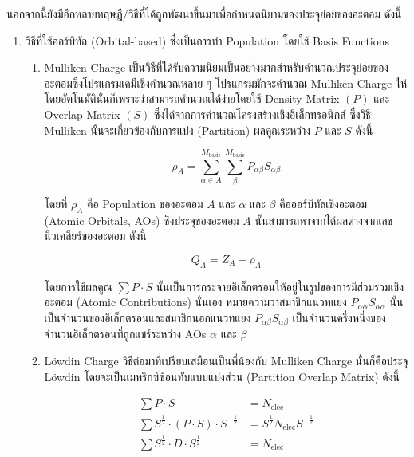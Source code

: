 นอกจากนี้ยังมีอีกหลายทฤษฎี/วิธีที่ได้ถูกพัฒนาขึ้นมาเพื่อกำหนดนิยามของประจุย่อยของอะตอม ดังนี้
%
\begin{enumerate}[topsep=0pt,noitemsep]\setlength\itemsep{0.5em}
    \item วิธีที่ใช้ออร์บิทัล (Orbital-based) ซึ่งเป็นการทำ Population โดยใช้ Basis Functions
          \begin{enumerate}
              \item Mulliken Charge\autocite{szabo1996} เป็นวิธีที่ได้รับความนิยมเป็นอย่างมากสำหรับคำนวณประจุย่อยของอะตอมซึ่งโปรแกรมเคมีเชิงคำนวณหลาย ๆ โปรแกรมมักจะคำนวณ Mulliken Charge ให้โดยอัตโนมัตินั่นก็เพราะว่าสามารถคำนวณได้ง่ายโดยใช้ Density Matrix $(P)$ และ Overlap Matrix $(S)$ ซึ่งได้จากการคำนวณโครงสร้างเชิงอิเล็กทรอนิกส์ ซึ่งวิธี Mulliken นั้นจะเกี่ยวข้องกับการแบ่ง (Partition) ผลคูณระหว่าง $P$ และ $S$ ดังนี้

                    \begin{equation}\label{eq:mulliken_pop}
                        \rho_{A} = \sum^{M_{\text{basis}}}_{\alpha \in A} \sum^{M_{\text{basis}}}_{\beta}
                        P_{\alpha\beta} S_{\alpha\beta}
                    \end{equation}

                    \noindent โดยที่ $\rho_{A}$ คือ Population ของอะตอม $A$ และ $\alpha$ และ $\beta$ คือออร์บิทัลเชิงอะตอม (Atomic Orbitals, AOs) ซึ่งประจุของอะตอม $A$ นั้นสามารถหาจากได้ผลต่างจากเลขนิวเคลียร์ของอะตอม ดังนี้

                    \begin{equation}\label{eq:mulliken_charge}
                        Q_{A} = Z_{A} - \rho_{A}
                    \end{equation}

                    \noindent โดยการใช้ผลคูณ $\sum P \cdot S$ นั้นเป็นการกระจายอิเล็กตรอนให้อยู่ในรูปของการมีส่วมรวมเชิงอะตอม (Atomic Contributions) นั่นเอง หมายความว่าสมาชิกแนวทแยง $P_{\alpha\alpha} S_{\alpha\alpha}$ นั้นเป็นจำนวนของอิเล็กตรอนและสมาชิกนอกแนวทแยง $P_{\alpha\beta} S_{\alpha\beta}$ เป็นจำนวนครึ่งหนึ่งของจำนวนอิเล็กตรอนที่ถูกแชร์ระหว่าง AOs $\alpha$ และ $\beta$

              \item L\"{o}wdin Charge\autocite{lowdin1950} วิธีต่อมาที่เปรียบเสมือนเป็นพี่น้องกับ Mulliken Charge นั่นก็คือประจุ
                    L\"{o}wdin โดยจะเป็นเมทริกซ์ซ้อนทับแบบแบ่งส่วน (Partition Overlap Matrix) ดังนี้

                    \begin{align}
                        \sum P \cdot S                                                & = N_{\text{elec}}                          \\
                        \sum S^{\frac{1}{2}} \cdot (P \cdot S) \cdot S^{-\frac{1}{2}} & =
                        S^{\frac{1}{2}} N_{\text{elec}} S^{-\frac{1}{2}}                                                           \\
                        \sum S^{\frac{1}{2}} \cdot D \cdot S^{\frac{1}{2}}            & = N_{\text{elec}} \label{eq:lowdin_charge}
                    \end{align}
          \end{enumerate}


\end{enumerate}
